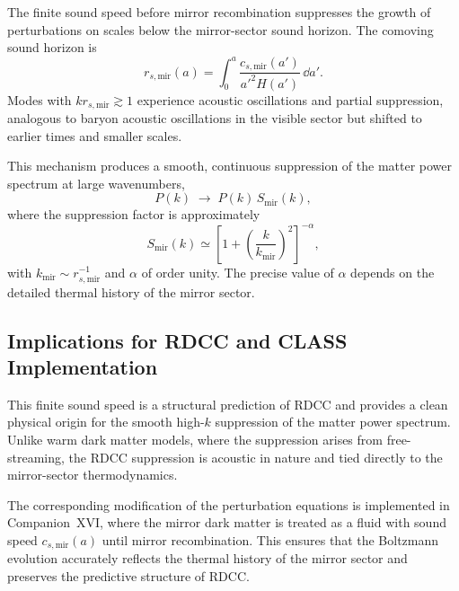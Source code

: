 \documentclass[11pt,a4paper]{article}
\begin{document}
The finite sound speed before mirror recombination suppresses the growth of
perturbations on scales below the mirror-sector sound horizon. The comoving
sound horizon is
\begin{equation}
r_{s,\mathrm{mir}}(a)
    = \int_{0}^{a} \frac{c_{s,\mathrm{mir}}(a')}{a'^{2} H(a')} \,\dd a'.
\end{equation}
Modes with $k r_{s,\mathrm{mir}} \gtrsim 1$ experience acoustic oscillations and
partial suppression, analogous to baryon acoustic oscillations in the visible
sector but shifted to earlier times and smaller scales.

This mechanism produces a smooth, continuous suppression of the matter power
spectrum at large wavenumbers,
\begin{equation}
P(k) \;\longrightarrow\; P(k)\, S_{\mathrm{mir}}(k),
\end{equation}
where the suppression factor is approximately
\begin{equation}
S_{\mathrm{mir}}(k)
    \simeq \left[1 + \left(\frac{k}{k_{\mathrm{mir}}}\right)^{2}\right]^{-\alpha},
\end{equation}
with $k_{\mathrm{mir}} \sim r_{s,\mathrm{mir}}^{-1}$ and $\alpha$ of order unity.
The precise value of $\alpha$ depends on the detailed thermal history of the
mirror sector.




\subsection{Implications for RDCC and CLASS Implementation}

This finite sound speed is a structural prediction of RDCC and provides a clean
physical origin for the smooth high-$k$ suppression of the matter power
spectrum. Unlike warm dark matter models, where the suppression arises from
free-streaming, the RDCC suppression is acoustic in nature and tied directly to
the mirror-sector thermodynamics.

The corresponding modification of the perturbation equations is implemented in
Companion~XVI, where the mirror dark matter is treated as a fluid with sound
speed $c_{s,\mathrm{mir}}(a)$ until mirror recombination. This ensures that the
Boltzmann evolution accurately reflects the thermal history of the mirror
sector and preserves the predictive structure of RDCC.
\end{document}

